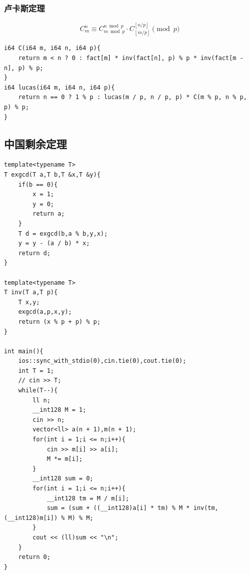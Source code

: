 \subsubsection{卢卡斯定理}
$$ C^n_m \equiv C^{n \bmod p}_{m \bmod p} \cdot C^{\left \lfloor n/p  \right \rfloor}
_{\left \lfloor m/p  \right \rfloor} \pmod p $$
\begin{lstlisting}[caption={}]
i64 C(i64 m, i64 n, i64 p){
    return m < n ? 0 : fact[m] * inv(fact[n], p) % p * inv(fact[m - n], p) % p;
}
i64 lucas(i64 m, i64 n, i64 p){
    return n == 0 ? 1 % p : lucas(m / p, n / p, p) * C(m % p, n % p, p) % p;
}
\end{lstlisting}

\subsection{中国剩余定理}
\begin{lstlisting}[caption={}]
template<typename T>
T exgcd(T a,T b,T &x,T &y){
	if(b == 0){
		x = 1;
		y = 0;
		return a;
	}
	T d = exgcd(b,a % b,y,x);
	y = y - (a / b) * x;
	return d;
}

template<typename T>
T inv(T a,T p){
    T x,y;
    exgcd(a,p,x,y);
    return (x % p + p) % p;
}

int main(){
    ios::sync_with_stdio(0),cin.tie(0),cout.tie(0);
    int T = 1;
    // cin >> T;
    while(T--){
        ll n;
        __int128 M = 1;
        cin >> n;
        vector<ll> a(n + 1),m(n + 1);
        for(int i = 1;i <= n;i++){
            cin >> m[i] >> a[i];
            M *= m[i];
        }
        __int128 sum = 0;
        for(int i = 1;i <= n;i++){
            __int128 tm = M / m[i];
            sum = (sum + ((__int128)a[i] * tm) % M * inv(tm,(__int128)m[i]) % M) % M;
        }
        cout << (ll)sum << "\n";
    }   
    return 0;
}
\end{lstlisting}


